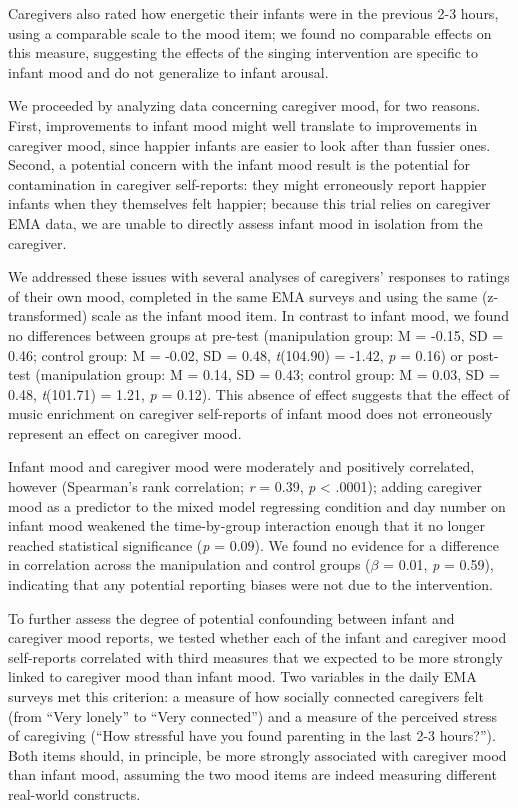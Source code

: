 \documentclass[
]{article}
\begin{document}
Caregivers also rated how energetic their infants were in the previous
2-3 hours, using a comparable scale to the mood item; we found no
comparable effects on this measure, suggesting the effects of the
singing intervention are specific to infant mood and do not generalize
to infant arousal.

We proceeded by analyzing data concerning caregiver mood, for two
reasons. First, improvements to infant mood might well translate to
improvements in caregiver mood, since happier infants are easier to look
after than fussier ones. Second, a potential concern with the infant
mood result is the potential for contamination in caregiver
self-reports: they might erroneously report happier infants when they
themselves felt happier; because this trial relies on caregiver EMA
data, we are unable to directly assess infant mood in isolation from the
caregiver.

We addressed these issues with several analyses of caregivers' responses
to ratings of their own mood, completed in the same EMA surveys and
using the same (z-transformed) scale as the infant mood item. In
contrast to infant mood, we found no differences between groups at
pre-test (manipulation group: M = -0.15, SD = 0.46; control group: M =
-0.02, SD = 0.48, \emph{t}(104.90) = -1.42, \emph{p} = 0.16) or
post-test (manipulation group: M = 0.14, SD = 0.43; control group: M =
0.03, SD = 0.48, \emph{t}(101.71) = 1.21, \emph{p} = 0.12). This absence
of effect suggests that the effect of music enrichment on caregiver
self-reports of infant mood does not erroneously represent an effect on
caregiver mood.

Infant mood and caregiver mood were moderately and positively
correlated, however (Spearman's rank correlation; \emph{r} = 0.39,
\emph{p} \textless{} .0001); adding caregiver mood as a predictor to the
mixed model regressing condition and day number on infant mood weakened
the time-by-group interaction enough that it no longer reached
statistical significance (\emph{p} = 0.09). We found no evidence for a
difference in correlation across the manipulation and control groups
(\(\beta\) = 0.01, \emph{p} = 0.59), indicating that any potential
reporting biases were not due to the intervention.

To further assess the degree of potential confounding between infant and
caregiver mood reports, we tested whether each of the infant and
caregiver mood self-reports correlated with third measures that we
expected to be more strongly linked to caregiver mood than infant mood.
Two variables in the daily EMA surveys met this criterion: a measure of
how socially connected caregivers felt (from ``Very lonely'' to ``Very
connected'') and a measure of the perceived stress of caregiving (``How
stressful have you found parenting in the last 2-3 hours?''). Both items
should, in principle, be more strongly associated with caregiver mood
than infant mood, assuming the two mood items are indeed measuring
different real-world constructs.
\end{document}
